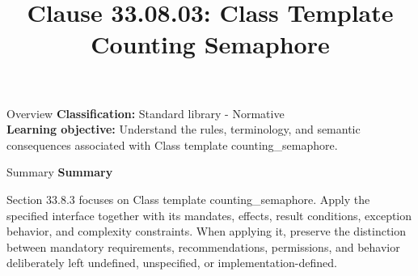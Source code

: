 \documentclass[10pt,letterpaper]{article}
\title{Clause 33.08.03: Class Template Counting Semaphore}
\author{}
\date{}
\begin{document}
\maketitle
\begin{CornellOverviewBox}{Overview}
\textbf{Classification:} Standard library - Normative\\[2pt]
\textbf{Learning objective:} Understand the rules, terminology, and semantic consequences associated with Class template counting\_semaphore.
\end{CornellOverviewBox}\begin{CornellSummaryBox}{Summary}
{\sffamily\bfseries\color{Accent} Summary}\par\vspace{3pt}Section 33.8.3 focuses on Class template counting\_semaphore. Apply the specified interface together with its mandates, effects, result conditions, exception behavior, and complexity constraints. When applying it, preserve the distinction between mandatory requirements, recommendations, permissions, and behavior deliberately left undefined, unspecified, or implementation-defined.
\end{CornellSummaryBox}
\end{document}
